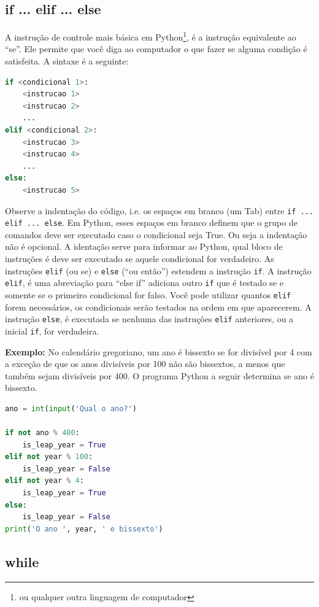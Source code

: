 \subsection{if ... elif ... else}

A instrução de controle mais básica em Python\footnote{ou qualquer outra linguagem de computador}, é a instrução equivalente ao ``se''. Ele permite que você diga ao computador o que fazer se alguma condição é satisfeita. A sintaxe é a seguinte:
\begin{lstlisting}[language=Python]
if <condicional 1>:
    <instrucao 1>
    <instrucao 2>
    ...
elif <condicional 2>:
    <instrucao 3>
    <instrucao 4>
    ...
else:
    <instrucao 5>
\end{lstlisting}
Observe a indentação do código, i.e. os espaços em branco (um Tab) entre {\tt if ... elif ... else}. Em Python, esses espaços em branco definem que o grupo de comandos deve ser executado caso o condicional seja True. Ou seja a indentação não é opcional. A identação serve para informar ao Python, qual bloco de instruções é deve ser executado se aquele condicional for verdadeiro. As instruções {\tt elif} (ou se) e {\tt else} (``ou então'') estendem a instrução {\tt if}. A instrução {\tt elif}, é uma abreviação para “else if” adiciona outro {\tt if} que é testado se e somente se o primeiro condicional for falso. Você pode utilizar quantos {\tt elif} forem necessários, os condicionais serão testados na ordem em que aparecerem. A instrução {\tt else}, é executada  se nenhuma das instruções {\tt elif} anteriores, ou a inicial {\tt if}, for verdadeira.

{\bf Exemplo:} No calendário gregoriano, um ano é bissexto se for divisível por 4 com a exceção de que os anos divisíveis por 100 não são bissextos, a menos que também sejam
divisíveis por 400. O programa Python a seguir determina se ano é bissexto.
\begin{lstlisting}[language=Python, frame=lines,basicstyle=\footnotesize, caption={Determinando se um ano é bissexto.}, label={lst:bissexto}]
ano = int(input('Qual o ano?')

if not ano % 400:
    is_leap_year = True
elif not year % 100:
    is_leap_year = False
elif not year % 4:
    is_leap_year = True
else:
    is_leap_year = False
print('O ano ', year, ' e bissexto')
\end{lstlisting}

\subsection{while}

